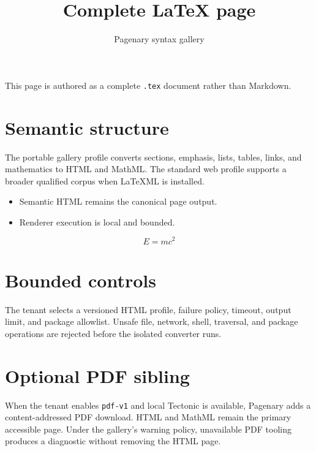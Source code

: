 \documentclass{article}
\title{Complete LaTeX page}
\author{Pagenary syntax gallery}
\begin{document}
\maketitle

This page is authored as a complete \texttt{.tex} document rather than Markdown.

\section{Semantic structure}

The portable gallery profile converts sections, emphasis, lists, tables, links, and mathematics to HTML
and MathML. The standard web profile supports a broader qualified corpus when LaTeXML is installed.

\begin{itemize}
  \item Semantic HTML remains the canonical page output.
  \item Renderer execution is local and bounded.
\end{itemize}

\begin{equation}
  E = mc^2
\end{equation}

\section{Bounded controls}

The tenant selects a versioned HTML profile, failure policy, timeout, output
limit, and package allowlist. Unsafe file, network, shell, traversal, and package
operations are rejected before the isolated converter runs.

\section{Optional PDF sibling}

When the tenant enables \texttt{pdf-v1} and local Tectonic is available,
Pagenary adds a content-addressed PDF download. HTML and MathML remain the
primary accessible page. Under the gallery's warning policy, unavailable PDF
tooling produces a diagnostic without removing the HTML page.
\end{document}
